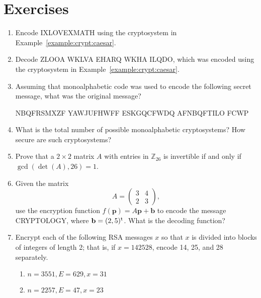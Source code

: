  
 
\section*{Exercises}
\exrule
 
 
{\small 
\begin{enumerate}
 
\item
Encode IXLOVEXMATH using the cryptosystem in Example~\ref{example:crypt:caesar}.
 
\item
Decode ZLOOA WKLVA EHARQ WKHA ILQDO, which was encoded using the
cryptosystem in Example~\ref{example:crypt:caesar}. 
 
 
\item
Assuming that monoalphabetic code was used to encode the following
secret message, what was the original message?
\begin{center}
NBQFRSMXZF YAWJUFHWFF ESKGQCFWDQ AFNBQFTILO FCWP
\end{center}
 
 
 
\item
What is the total number of possible monoalphabetic cryptosystems? How 
secure are such cryptosystems?
 
 
\item
Prove that a $2 \times 2$ matrix $A$ with entries in ${\mathbb Z}_{26}$
is invertible if and only if $\gcd( \det(A), 26 ) = 1$.
 
 
 
\item
Given the matrix 
\[
A =
\begin{pmatrix}
3 & 4 \\
2 & 3
\end{pmatrix},
\]
use the encryption function $f({\mathbf p}) = A {\mathbf p} + {\mathbf b}$
to encode the message CRYPTOLOGY, where ${\mathbf b} = ( 2, 5)^{\rm
t}$.  What is the decoding function?  
 
 
\item\label{RSA_Exercise}
Encrypt each of the following RSA messages $x$ so that $x$ is divided
into blocks of integers of length 2;  that is, if $x = 142528$, encode 
14, 25, and 28 separately.
\begin{enumerate}
 
 
\item
$n = 3551, E = 629, x = 31$
 
\item
$n = 2257, E = 47, x = 23$


\end{enumerate}
\end{enumerate}}
